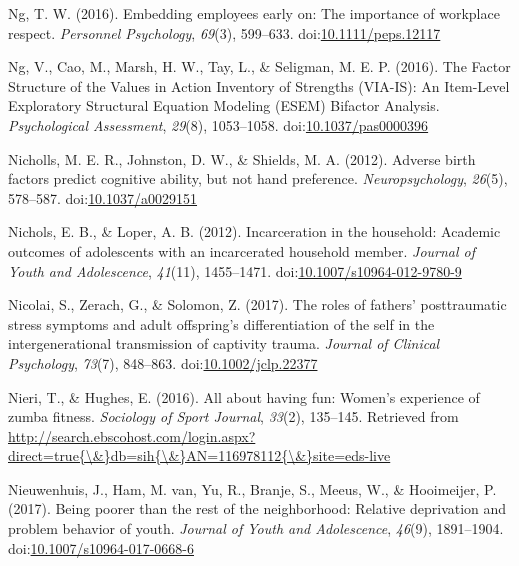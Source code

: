 \documentclass[english,man]{apa6}
\theoremstyle{definition}
\theoremstyle{definition}
\theoremstyle{definition}
\theoremstyle{remark}
\begin{document}
\hypertarget{ref-Ng2016}{}
Ng, T. W. (2016). Embedding employees early on: The importance of
workplace respect. \emph{Personnel Psychology}, \emph{69}(3), 599--633.
doi:\href{https://doi.org/10.1111/peps.12117}{10.1111/peps.12117}

\hypertarget{ref-Ng2017}{}
Ng, V., Cao, M., Marsh, H. W., Tay, L., \& Seligman, M. E. P. (2016).
The Factor Structure of the Values in Action Inventory of Strengths
(VIA-IS): An Item-Level Exploratory Structural Equation Modeling (ESEM)
Bifactor Analysis. \emph{Psychological Assessment}, \emph{29}(8),
1053--1058.
doi:\href{https://doi.org/10.1037/pas0000396}{10.1037/pas0000396}

\hypertarget{ref-Nicholls2012}{}
Nicholls, M. E. R., Johnston, D. W., \& Shields, M. A. (2012). Adverse
birth factors predict cognitive ability, but not hand preference.
\emph{Neuropsychology}, \emph{26}(5), 578--587.
doi:\href{https://doi.org/10.1037/a0029151}{10.1037/a0029151}

\hypertarget{ref-Nichols2012}{}
Nichols, E. B., \& Loper, A. B. (2012). Incarceration in the household:
Academic outcomes of adolescents with an incarcerated household member.
\emph{Journal of Youth and Adolescence}, \emph{41}(11), 1455--1471.
doi:\href{https://doi.org/10.1007/s10964-012-9780-9}{10.1007/s10964-012-9780-9}

\hypertarget{ref-Nicolai2017}{}
Nicolai, S., Zerach, G., \& Solomon, Z. (2017). The roles of fathers'
posttraumatic stress symptoms and adult offspring's differentiation of
the self in the intergenerational transmission of captivity trauma.
\emph{Journal of Clinical Psychology}, \emph{73}(7), 848--863.
doi:\href{https://doi.org/10.1002/jclp.22377}{10.1002/jclp.22377}

\hypertarget{ref-Nieri2016}{}
Nieri, T., \& Hughes, E. (2016). All about having fun: Women's
experience of zumba fitness. \emph{Sociology of Sport Journal},
\emph{33}(2), 135--145. Retrieved from
\href{http://search.ebscohost.com/login.aspx?direct=true\%7B/\&\%7Ddb=sih\%7B/\&\%7DAN=116978112\%7B/\&\%7Dsite=eds-live}{http://search.ebscohost.com/login.aspx?direct=true\{\textbackslash{}\&\}db=sih\{\textbackslash{}\&\}AN=116978112\{\textbackslash{}\&\}site=eds-live}

\hypertarget{ref-Nieuwenhuis2017}{}
Nieuwenhuis, J., Ham, M. van, Yu, R., Branje, S., Meeus, W., \&
Hooimeijer, P. (2017). Being poorer than the rest of the neighborhood:
Relative deprivation and problem behavior of youth. \emph{Journal of
Youth and Adolescence}, \emph{46}(9), 1891--1904.
doi:\href{https://doi.org/10.1007/s10964-017-0668-6}{10.1007/s10964-017-0668-6}
\end{document}
